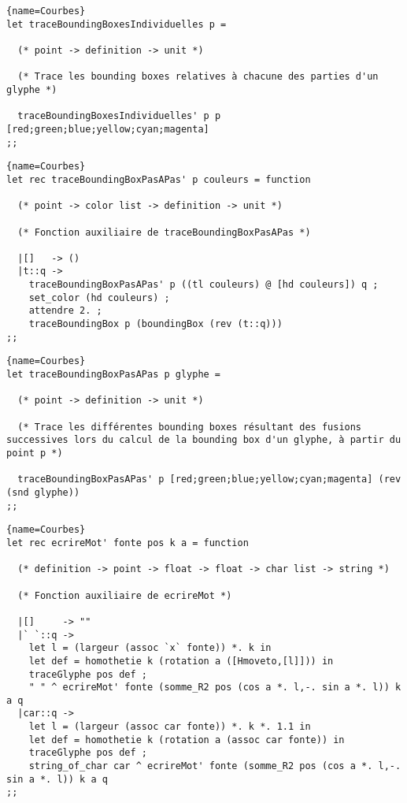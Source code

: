 \documentclass[10pt,twoside,a4paper]{article}
\begin{document}
\begin{lstlisting}{name=Courbes}
let traceBoundingBoxesIndividuelles p =

  (* point -> definition -> unit *)

  (* Trace les bounding boxes relatives à chacune des parties d'un glyphe *)

  traceBoundingBoxesIndividuelles' p p [red;green;blue;yellow;cyan;magenta]
;;
\end{lstlisting}  
\pagebreak
\begin{lstlisting}{name=Courbes}
let rec traceBoundingBoxPasAPas' p couleurs = function

  (* point -> color list -> definition -> unit *)

  (* Fonction auxiliaire de traceBoundingBoxPasAPas *)

  |[]   -> ()
  |t::q ->
    traceBoundingBoxPasAPas' p ((tl couleurs) @ [hd couleurs]) q ;
    set_color (hd couleurs) ;
    attendre 2. ;
    traceBoundingBox p (boundingBox (rev (t::q)))
;;
\end{lstlisting}

\begin{lstlisting}{name=Courbes}
let traceBoundingBoxPasAPas p glyphe =

  (* point -> definition -> unit *)

  (* Trace les différentes bounding boxes résultant des fusions successives lors du calcul de la bounding box d'un glyphe, à partir du point p *)
  
  traceBoundingBoxPasAPas' p [red;green;blue;yellow;cyan;magenta] (rev (snd glyphe))
;;
\end{lstlisting}

\begin{lstlisting}{name=Courbes}
let rec ecrireMot' fonte pos k a = function

  (* definition -> point -> float -> float -> char list -> string *)

  (* Fonction auxiliaire de ecrireMot *)

  |[]     -> ""
  |` `::q ->
    let l = (largeur (assoc `x` fonte)) *. k in
    let def = homothetie k (rotation a ([Hmoveto,[l]])) in
    traceGlyphe pos def ;
    " " ^ ecrireMot' fonte (somme_R2 pos (cos a *. l,-. sin a *. l)) k a q
  |car::q ->
    let l = (largeur (assoc car fonte)) *. k *. 1.1 in
    let def = homothetie k (rotation a (assoc car fonte)) in
    traceGlyphe pos def ;
    string_of_char car ^ ecrireMot' fonte (somme_R2 pos (cos a *. l,-. sin a *. l)) k a q
;;
\end{lstlisting}
\end{document}
